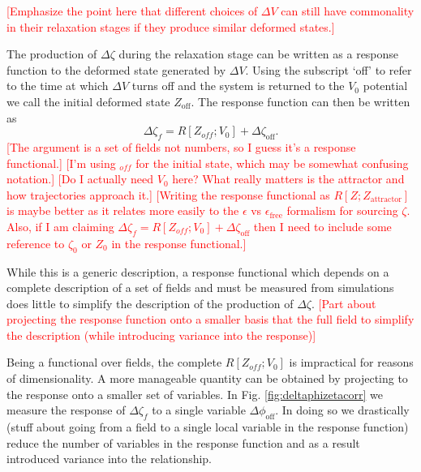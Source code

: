 \textcolor{red}{[Emphasize the point here that different choices of $\Delta V$ can still have commonality in their relaxation stages if they produce similar deformed states.]}

The production of $\Delta\zeta$ during the relaxation stage can be written as a response function to the deformed state generated by $\Delta V$. Using the subscript `off' to refer to the time at which $\Delta V$ turns off and the system is returned to the $V_0$ potential we call the initial deformed state $Z_\mathrm{off}$. The response function can then be written as 
\begin{equation}
  \Delta\zeta_f = R[Z_{off};V_0] + \Delta\zeta_\mathrm{off}.
\end{equation}
\textcolor{red}{[The argument is a set of fields not numbers, so I guess it's a response functional.]}
\textcolor{red}{[I'm using ${}_{off}$ for the initial state, which may be somewhat confusing notation.]}
\textcolor{red}{[Do I actually need $V_0$ here? What really matters is the attractor and how trajectories approach it.]}
\textcolor{red}{[Writing the response functional as $R[Z;Z_\mathrm{attractor}]$ is maybe better as it relates more easily to the $\epsilon$ vs $\epsilon_\mathrm{free}$ formalism for sourcing $\zeta$. Also, if I am claiming $\Delta\zeta_f = R[Z_{off};V_0] + \Delta\zeta_\mathrm{off}$ then I need to include some reference to $\zeta_0$ or $Z_0$ in the response functional.]}



While this is a generic description, a response functional which depends on a complete description of a set of fields and must be measured from simulations does little to simplify the description of the production of $\Delta\zeta$.
\textcolor{red}{[Part about projecting the response function onto a smaller basis that the full field to simplify the description (while introducing variance into the response)]}

Being a functional over fields, the complete $R[Z_{off};V_0]$ is impractical for reasons of dimensionality. A more manageable quantity can be obtained by projecting to the response onto a smaller set of variables. In Fig. \ref{fig:deltaphizetacorr} we measure the response of $\Delta\zeta_f$ to a single variable $\Delta\phi_\mathrm{off}$. In doing so we drastically
(stuff about going from a field to a single local variable in the response function)
reduce the number of variables in the response function and as a result introduced variance into the relationship.

